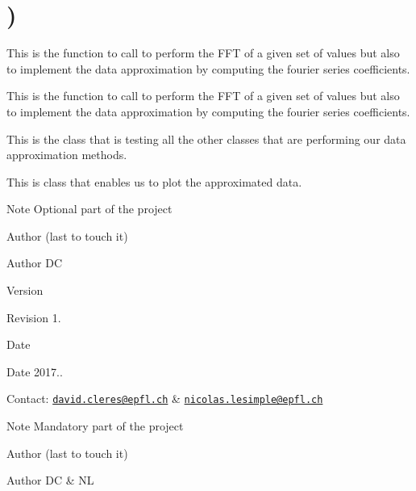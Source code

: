 \hypertarget{group__somewhere}{}\section{)}
\label{group__somewhere}


This is the function to call to perform the F\+FT of a given set of values but also to implement the data approximation by computing the fourier series coefficients.  


This is the function to call to perform the F\+FT of a given set of values but also to implement the data approximation by computing the fourier series coefficients. 

This is the class that is testing all the other classes that are performing our data approximation methods.

This is class that enables us to plot the approximated data.

\begin{DoxyNote}{Note}
Optional part of the project
\end{DoxyNote}
\begin{DoxyAuthor}{Author}
(last to touch it) 
\end{DoxyAuthor}
\begin{DoxyParagraph}{Author}
DC 
\end{DoxyParagraph}


\begin{DoxyVersion}{Version}

\end{DoxyVersion}
\begin{DoxyParagraph}{Revision}
1. 
\end{DoxyParagraph}


\begin{DoxyDate}{Date}

\end{DoxyDate}
\begin{DoxyParagraph}{Date}
2017.. 
\end{DoxyParagraph}


Contact\+: \href{mailto:david.cleres@epfl.ch}{\tt david.\+cleres@epfl.\+ch} \& \href{mailto:nicolas.lesimple@epfl.ch}{\tt nicolas.\+lesimple@epfl.\+ch}

\begin{DoxyNote}{Note}
Mandatory part of the project
\end{DoxyNote}
\begin{DoxyAuthor}{Author}
(last to touch it) 
\end{DoxyAuthor}
\begin{DoxyParagraph}{Author}
DC \& NL
\end{DoxyParagraph}


